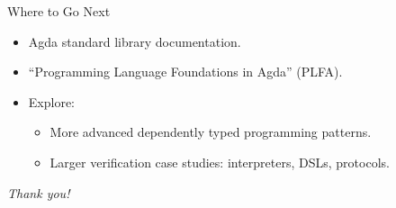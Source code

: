 \documentclass[aspectratio=169]{beamer}
\begin{document}
\begin{frame}{Where to Go Next}
  \begin{itemize}
    \item Agda standard library documentation.
    \item “Programming Language Foundations in Agda” (PLFA).
    \item Explore:
      \begin{itemize}
        \item More advanced dependently typed programming patterns.
        \item Larger verification case studies: interpreters, DSLs, protocols.
      \end{itemize}
  \end{itemize}
  \vfill
  \centering
  \textit{Thank you!}
\end{frame}

\end{document}
